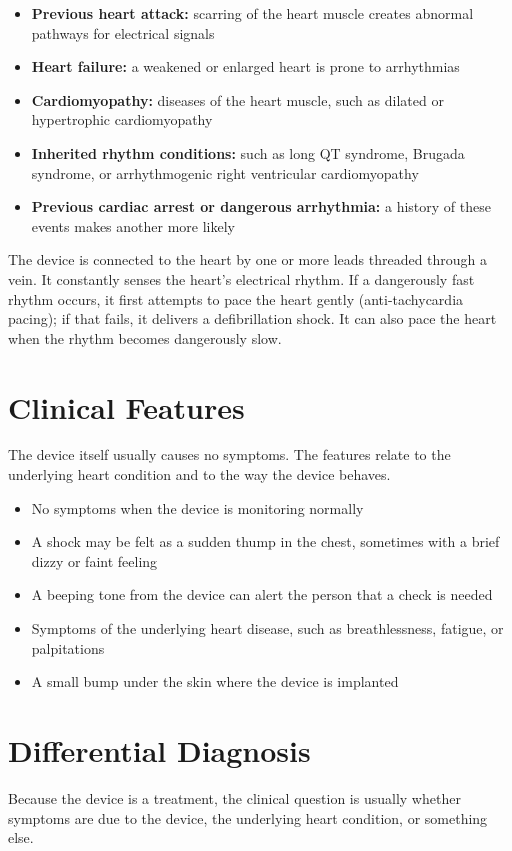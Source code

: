 \begin{itemize}
    \item \textbf{Previous heart attack:} scarring of the heart muscle creates abnormal pathways for electrical signals
    \item \textbf{Heart failure:} a weakened or enlarged heart is prone to arrhythmias
    \item \textbf{Cardiomyopathy:} diseases of the heart muscle, such as dilated or hypertrophic cardiomyopathy
    \item \textbf{Inherited rhythm conditions:} such as long QT syndrome, Brugada syndrome, or arrhythmogenic right ventricular cardiomyopathy
    \item \textbf{Previous cardiac arrest or dangerous arrhythmia:} a history of these events makes another more likely
\end{itemize}

The device is connected to the heart by one or more leads threaded through a vein. It constantly senses the heart's electrical rhythm. If a dangerously fast rhythm occurs, it first attempts to pace the heart gently (anti-tachycardia pacing); if that fails, it delivers a defibrillation shock. It can also pace the heart when the rhythm becomes dangerously slow.

\section*{Clinical Features}
The device itself usually causes no symptoms. The features relate to the underlying heart condition and to the way the device behaves.

\begin{itemize}
    \item No symptoms when the device is monitoring normally
    \item A shock may be felt as a sudden thump in the chest, sometimes with a brief dizzy or faint feeling
    \item A beeping tone from the device can alert the person that a check is needed
    \item Symptoms of the underlying heart disease, such as breathlessness, fatigue, or palpitations
    \item A small bump under the skin where the device is implanted
\end{itemize}

\section*{Differential Diagnosis}
Because the device is a treatment, the clinical question is usually whether symptoms are due to the device, the underlying heart condition, or something else.

